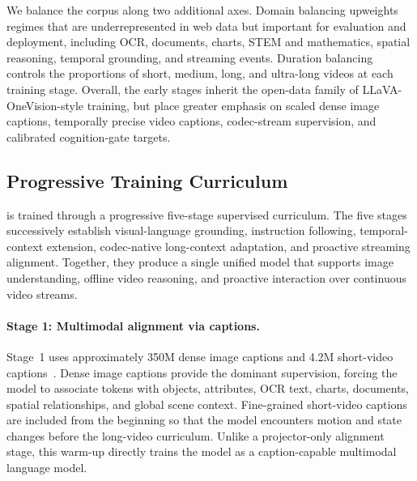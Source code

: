 We balance the corpus along two additional axes. Domain balancing upweights regimes that are underrepresented in web data but important for evaluation and deployment, including OCR, documents, charts, STEM and mathematics, spatial reasoning, temporal grounding, and streaming events. Duration balancing controls the proportions of short, medium, long, and ultra-long videos at each training stage. Overall, the early stages inherit the open-data family of LLaVA-OneVision-style training, but place greater emphasis on scaled dense image captions, temporally precise video captions, codec-stream supervision, and calibrated cognition-gate targets.




\subsection{Progressive Training Curriculum}
\label{sec:magevl_training}

\magevl is trained through a progressive five-stage supervised curriculum. The five stages successively establish visual-language grounding, instruction following, temporal-context extension, codec-native long-context adaptation, and proactive streaming alignment. Together, they produce a single unified model that supports image understanding, offline video reasoning, and proactive interaction over continuous video streams. 

\paragraph{Stage 1: Multimodal alignment via captions.}
Stage~1 uses approximately 350M dense image captions and 4.2M short-video captions~\citep{llavaonevision2}. Dense image captions provide the dominant supervision, forcing the model to associate \magevit tokens with objects, attributes, OCR text, charts, documents, spatial relationships, and global scene context. Fine-grained short-video captions are included from the beginning so that the model encounters motion and state changes before the long-video curriculum. Unlike a projector-only alignment stage, this warm-up directly trains the model as a caption-capable multimodal language model.


